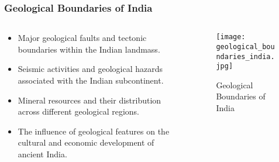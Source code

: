 \begin{frame}[fragile]\frametitle{Geological Boundaries of India}
\begin{columns}
\begin{column}{0.5\textwidth}
\begin{itemize}
   \item Major geological faults and tectonic boundaries within the Indian landmass.
   \item Seismic activities and geological hazards associated with the Indian subcontinent.
   \item Mineral resources and their distribution across different geological regions.
   \item The influence of geological features on the cultural and economic development of ancient India.
\end{itemize}
\end{column}
\begin{column}{0.5\textwidth}
\begin{figure}
   \texttt{[image: geological\_boundaries\_india.jpg]}
   \caption{Geological Boundaries of India}
\end{figure}
\end{column}
\end{columns}
\end{frame}